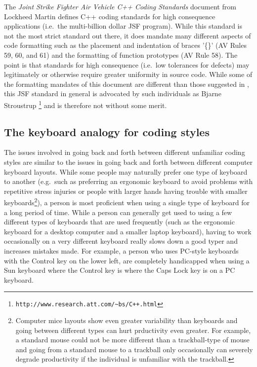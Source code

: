 The {}\textit{Joint Strike Fighter Air Vehicle C++ Coding Standards} document
{}\cite{JSFAVC++CodingStandards2005} from Lockheed Martin defines C++ coding
standards for high consequence applications (i.e.\ the multi-billion dollar
JSF program).  While this standard is not the most strict standard out there,
it does mandate many different aspects of code formatting such as the
placement and indentation of braces '\{\}' (AV Rules 59, 60, and 61) and the
formatting of function prototypes (AV Rule 58).  The point is that standards
for high consequence (i.e.\ low tolerances for defects) may legitimately or
otherwise require greater uniformity in source code.  While some of the
formatting mandates of this document are different than those suggested in
{}\cite[Chapter 31]{CodeComplete2nd04}, this JSF standard in general is
advocated by such individuals as Bjarne Stroustrup
{}\footnote{{}\texttt{http://www.research.att.com/\~{}bs/C++.html}} and is
therefore not without some merit.

%
\subsection{The keyboard analogy for coding styles}
%

The issues involved in going back and forth between different unfamiliar
coding styles are similar to the issues in going back and forth between
different computer keyboard layouts.  While some people may naturally prefer
one type of keyboard to another (e.g.\ such as preferring an ergonomic
keyboard to avoid problems with repetitive stress injuries or people with
larger hands having trouble with smaller keyboards\footnote{Computer mice
layouts show even greater variability than keyboards and going between
different types can hurt prductivity even greater.  For example, a standard
mouse could not be more different than a trackball-type of mouse and going
from a standard mouse to a trackball only occasionally can severely degrade
productivity if the individual is unfamiliar with the trackball.}), a person
is most proficient when using a single type of keyboard for a long period of
time.  While a person can generally get used to using a few different types of
keyboards that are used frequently (such as the ergonomic keyboard for a
desktop computer and a smaller laptop keyboard), having to work occasionally
on a very different keyboard really slows down a good typer and increases
mistakes made.  For example, a person who uses PC-style keyboards with the
Control key on the lower left, are completely handicapped when using a Sun
keyboard where the Control key is where the Caps Lock key is on a PC keyboard.

